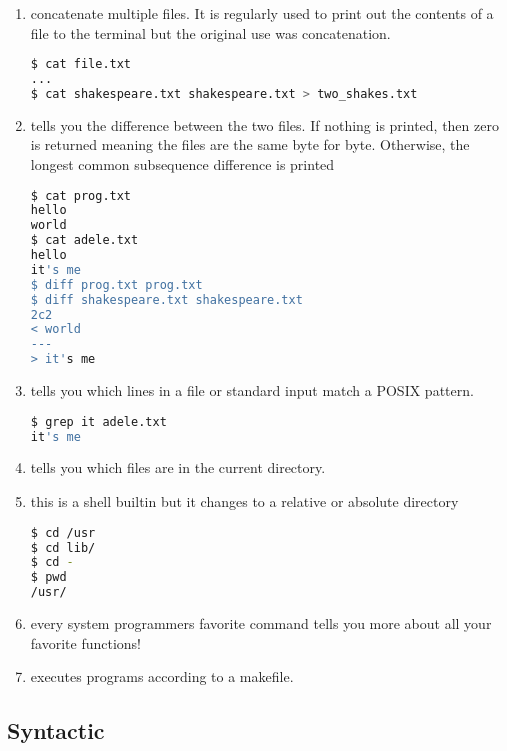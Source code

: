 \begin{enumerate}
\item {} concatenate multiple files. It is regularly used to print out the contents of a file to the terminal but the original use was concatenation.

\begin{lstlisting}[language=bash]
$ cat file.txt
...
$ cat shakespeare.txt shakespeare.txt > two_shakes.txt
\end{lstlisting}

\item {} tells you the difference between the two files. If nothing is printed, then zero is returned meaning the files are the same byte for byte. Otherwise, the longest common subsequence difference is printed

\begin{lstlisting}[language=bash]
$ cat prog.txt
hello
world
$ cat adele.txt
hello
it's me
$ diff prog.txt prog.txt
$ diff shakespeare.txt shakespeare.txt
2c2
< world
---
> it's me
\end{lstlisting}

\item {} tells you which lines in a file or standard input match a POSIX pattern.

\begin{lstlisting}[language=bash]
$ grep it adele.txt
it's me
\end{lstlisting}

\item {} tells you which files are in the current directory.
\item {} this is a shell builtin but it changes to a relative or absolute directory

\begin{lstlisting}[language=bash]
$ cd /usr
$ cd lib/
$ cd -
$ pwd
/usr/
\end{lstlisting}

\item {} every system programmers favorite command tells you more about all your favorite functions!
\item {} executes programs according to a makefile.

\end{enumerate}

\subsection{Syntactic}

